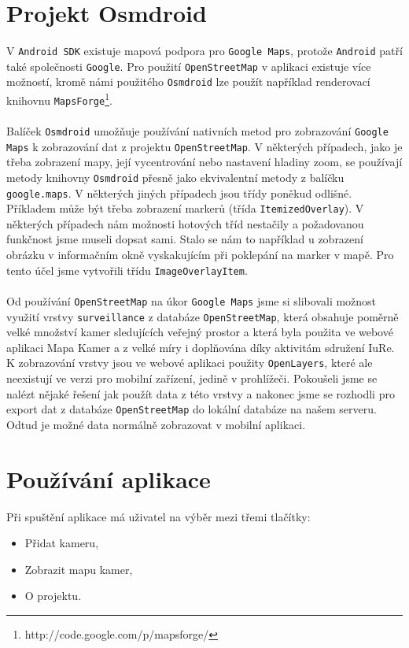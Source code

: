 \section{Projekt Osmdroid}
V \texttt{Android SDK} existuje mapová podpora pro \texttt{Google Maps}, protože \texttt{Android} patří také společnosti \texttt{Google}. Pro použití \texttt{OpenStreetMap} v aplikaci existuje více možností, kromě námi použitého \texttt{Osmdroid} lze použít například renderovací knihovnu \texttt{MapsForge}\footnote{http://code.google.com/p/mapsforge/}.
\paragraph{}
Balíček \texttt{Osmdroid} umožňuje používání nativních metod pro zobrazování \texttt{Google Maps} k zobrazování dat z projektu \texttt{OpenStreetMap}. V některých případech, jako je třeba zobrazení mapy, její vycentrování nebo nastavení hladiny zoom, se používají metody knihovny \texttt{Osmdroid} přesně jako ekvivalentní metody z balíčku \texttt{google.maps}. V některých jiných případech jsou třídy poněkud odlišné. Příkladem může být třeba zobrazení markerů (třída \texttt{ItemizedOverlay}). V některých případech nám možnosti hotových tříd nestačily a požadovanou funkčnost jsme museli dopsat sami. Stalo se nám to například u zobrazení obrázku v informačním okně vyskakujícím při poklepání na marker v mapě. Pro tento účel jsme vytvořili třídu \texttt{ImageOverlayItem}.
\paragraph{}
Od používání \texttt{OpenStreetMap} na úkor \texttt{Google Maps} jsme si slibovali možnost využití vrstvy \texttt{surveillance} z databáze \texttt{OpenStreetMap}, která obsahuje poměrně velké množství kamer sledujících veřejný prostor a která byla použita ve webové aplikaci Mapa Kamer a z velké míry i dopl\v{n}ována díky aktivitám sdružení  IuRe. K zobrazování vrstvy jsou ve webové aplikaci použity \texttt{OpenLayers}, které ale neexistují ve verzi pro mobilní zařízení, jedině v prohlížeči. Pokoušeli jsme se nalézt nějaké řešení jak použít data z této vrstvy a nakonec jsme se rozhodli pro export dat z databáze \texttt{OpenStreetMap} do lokální databáze na našem serveru. Odtud je možné data normálně zobrazovat v mobilní aplikaci.

\section{Používání aplikace}
Při spuštění aplikace má uživatel na výběr mezi třemi tlačítky:
\begin{itemize}
\item Přidat kameru,
\item Zobrazit mapu kamer,
\item O projektu.
\end{itemize}

